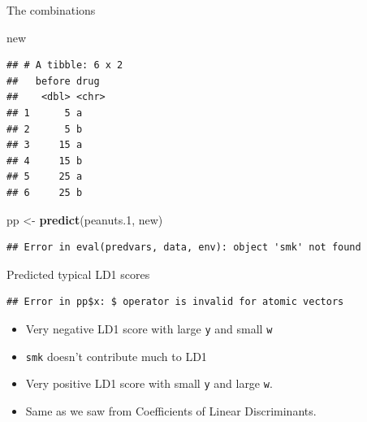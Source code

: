 \documentclass[ignorenonframetext,]{beamer}
\newenvironment{Shaded}{\begin{snugshade}}{\end{snugshade}}
\newcommand{\FloatTok}[1]{\textcolor[rgb]{0.00,0.00,0.81}{#1}}
\newcommand{\KeywordTok}[1]{\textcolor[rgb]{0.13,0.29,0.53}{\textbf{#1}}}
\newcommand{\NormalTok}[1]{#1}
\newcommand{\OperatorTok}[1]{\textcolor[rgb]{0.81,0.36,0.00}{\textbf{#1}}}
\newcommand{\StringTok}[1]{\textcolor[rgb]{0.31,0.60,0.02}{#1}}
\begin{document}
\begin{frame}[fragile]{The combinations}
\protect\hypertarget{the-combinations}{}

\begin{Shaded}
\begin{Highlighting}[]
\NormalTok{new}
\end{Highlighting}
\end{Shaded}

\begin{verbatim}
## # A tibble: 6 x 2
##   before drug 
##    <dbl> <chr>
## 1      5 a    
## 2      5 b    
## 3     15 a    
## 4     15 b    
## 5     25 a    
## 6     25 b
\end{verbatim}

\begin{Shaded}
\begin{Highlighting}[]
\NormalTok{pp <-}\StringTok{ }\KeywordTok{predict}\NormalTok{(peanuts}\FloatTok{.1}\NormalTok{, new)}
\end{Highlighting}
\end{Shaded}

\begin{verbatim}
## Error in eval(predvars, data, env): object 'smk' not found
\end{verbatim}

\end{frame}

\begin{frame}[fragile]{Predicted typical LD1 scores}
\protect\hypertarget{predicted-typical-ld1-scores}{}

\begin{Shaded}
\end{Shaded}

\begin{verbatim}
## Error in pp$x: $ operator is invalid for atomic vectors
\end{verbatim}

\begin{itemize}
\item
  Very negative LD1 score with large \texttt{y} and small \texttt{w}
\item
  \texttt{smk} doesn't contribute much to LD1
\item
  Very positive LD1 score with small \texttt{y} and large \texttt{w}.
\item
  Same as we saw from Coefficients of Linear Discriminants.
\end{itemize}

\end{frame}
\end{document}
